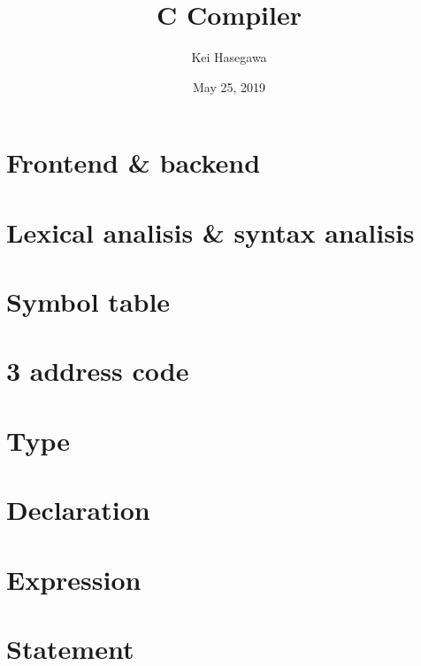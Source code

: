 \documentclass{report}
\begin{document}
\title{C Compiler}

\author{Kei Hasegawa}

\date{May 25, 2019}

\maketitle



\tableofcontents

\chapter{Frontend \& backend}



\chapter{Lexical analisis \& syntax analisis}



\chapter{Symbol table}



\chapter{3 address code}



\chapter{Type}



\chapter{Declaration}



\chapter{Expression}



\chapter{Statement}
\end{document}
